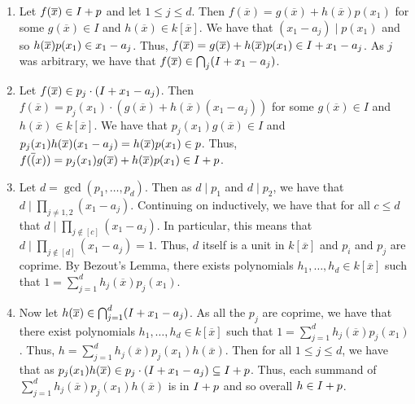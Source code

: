 \documentclass[letterpaper, 11pt, oneside]{book}
\begin{document}
\begin{sol}\label{ex:UAG_2.2.9}
  \begin{enumerate}
    \item Let $f(\overline{x}) \in I + \ideal{p}$ and let $1 \leq j \leq d$.
          Then $f(\overline{x}) = g(\overline{x}) + h(\overline{x})p(x_{1})$ for some $g(\overline{x}) \in I$ and $h(\overline{x}) \in k[\overline{x}]$.
          We have that $(x_{1} - a_{j}) \mid p(x_{1})$ and so $h(\overline{x})p(x_{1}) \in \ideal{x_{1} - a_{j}}$.
          Thus, $f(\overline{x}) = g(\overline{x}) + h(\overline{x})p(x_{1}) \in I + \ideal{x_{1} - a_{j}}$.
          As $j$ was arbitrary, we have that $f(\overline{x}) \in \bigcap_{j} (I + \ideal{x_{1} - a_{j}})$.
    \item Let $f(\overline{x}) \in p_{j} \cdot (I + \ideal{x_{1} - a_{j}})$.
          Then $f(\overline{x}) = p_{j}(x_{1})\cdot(g(\overline{x}) + h(\overline{x})(x_{1} - a_{j}))$ for some $g(\overline{x}) \in I$ and $h(\overline{x}) \in k[\overline{x}]$.
          We have that $p_{j}(x_{1})g(\overline{x}) \in I$ and $p_{j}(x_{1})h(\overline{x})(x_{1} - a_{j}) = h(\overline{x})p(x_{1}) \in \ideal{p}$.
          Thus, $f(\overline(x)) = p_{j}(x_{1})g(\overline{x}) + h(\overline{x})p(x_{1}) \in I + \ideal{p}$.
    \item Let $d = \gcd(p_{1}, \ldots, p_{d})$.
          Then as $d \mid p_{1}$ and $d \mid p_{2}$, we have that $d \mid \prod_{j \neq 1, 2} (x_{1} - a_{j})$.
          Continuing on inductively, we have that for all $c \leq d$ that $d \mid \prod_{j \notin [c]} (x_{1} - a_{j})$.
          In particular, this means that $d \mid \prod_{j \notin [d]} (x_{1} - a_{j}) = 1$.
          Thus, $d$ itself is a unit in $k[\overline{x}]$ and $p_{i}$ and $p_{j}$ are coprime.
          By Bezout's Lemma, there exists polynomials $h_{1}, \ldots, h_{d} \in k[\overline{x}]$ such that $1 = \sum_{j = 1}^{d} h_{j}(\overline{x})p_{j}(x_{1})$.
    \item Now let $h(\overline{x}) \in \bigcap_{j = 1}^{d} (I + \ideal{x_{1} - a_{j}})$.
          As all the $p_{j}$ are coprime, we have that there exist polynomials $h_{1}, \ldots, h_{d} \in k[\overline{x}]$ such that $1 = \sum_{j = 1}^{d} h_{j}(\overline{x})p_{j}(x_{1})$.
          Thus, $h = \sum_{j = 1}^{d} h_{j}(\overline{x})p_{j}(x_{1})h(\overline{x})$.
          Then for all $1 \leq j \leq d$, we have that as $p_{j}(x_{1})h(\overline{x}) \in p_{j} \cdot (I + \ideal{x_{1} - a_{j}}) \subseteq I + \ideal{p}$.
          Thus, each summand of $\sum_{j = 1}^{d} h_{j}(\overline{x})p_{j}(x_{1})h(\overline{x})$ is in $I + \ideal{p}$ and so overall $h \in I + \ideal{p}$.
  \end{enumerate}
\end{sol}
\end{document}
